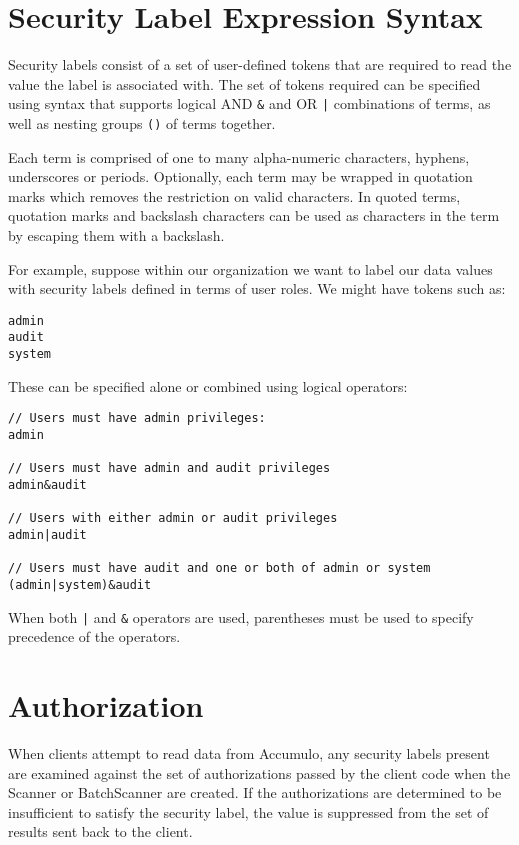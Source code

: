 \section{Security Label Expression Syntax}

Security labels consist of a set of user-defined tokens that are required to read the
value the label is associated with. The set of tokens required can be specified using
syntax that supports logical AND \verb^&^ and OR \verb^|^ combinations of terms, as
well as nesting groups \verb^()^ of terms together.

Each term is comprised of one to many alpha-numeric characters, hyphens, underscores or
periods. Optionally, each term may be wrapped in quotation marks
which removes the restriction on valid characters. In quoted terms, quotation marks
and backslash characters can be used as characters in the term by escaping them
with a backslash.

For example, suppose within our organization we want to label our data values with
security labels defined in terms of user roles. We might have tokens such as:

\small
\begin{verbatim}
admin
audit
system
\end{verbatim}
\normalsize

These can be specified alone or combined using logical operators:

\small
\begin{verbatim}
// Users must have admin privileges:
admin

// Users must have admin and audit privileges
admin&audit

// Users with either admin or audit privileges
admin|audit

// Users must have audit and one or both of admin or system
(admin|system)&audit
\end{verbatim}
\normalsize

When both \verb^|^ and \verb^&^ operators are used, parentheses must be used to specify
precedence of the operators.

\section{Authorization}

When clients attempt to read data from Accumulo, any security labels present are
examined against the set of authorizations passed by the client code when the
Scanner or BatchScanner are created. If the authorizations are determined to be
insufficient to satisfy the security label, the value is suppressed from the set of
results sent back to the client.

